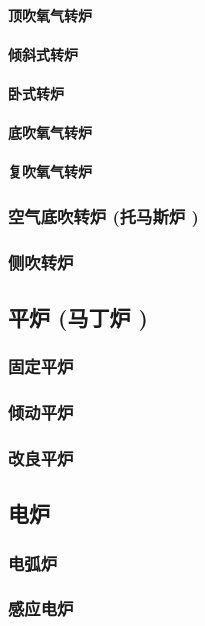 \documentclass[UTF8]{../../ApplicationUniverse}
\begin{document}
            \paragraph{顶吹氧气转炉}
            \paragraph{倾斜式转炉}
            \paragraph{卧式转炉}
            \paragraph{底吹氧气转炉}
            \paragraph{复吹氧气转炉}
        \subsubsection{空气底吹转炉 (托马斯炉 )}
        \subsubsection{侧吹转炉}
    \subsection{平炉 (马丁炉 )}
        \subsubsection{固定平炉}
        \subsubsection{倾动平炉}
        \subsubsection{改良平炉}
    \subsection{电炉}
        \subsubsection{电弧炉}
        \subsubsection{感应电炉}
\end{document}
